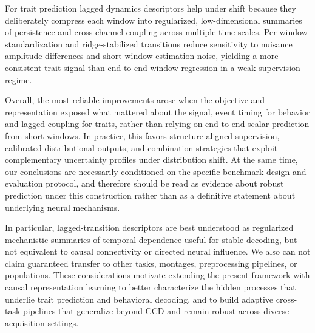 \documentclass[12pt]{article}
\begin{document}
For trait prediction lagged dynamics descriptors help under shift because they deliberately compress each window into regularized, low-dimensional summaries of persistence and cross-channel coupling across multiple time scales. Per-window standardization and ridge-stabilized transitions reduce sensitivity to nuisance amplitude differences and short-window estimation noise, yielding a more consistent trait signal than end-to-end window regression in a weak-supervision regime.


Overall, the most reliable improvements arose when the objective and representation exposed what mattered about
the signal, event timing for behavior and lagged coupling for traits, rather than relying on end-to-end scalar prediction
from short windows. In practice, this favors structure-aligned supervision, calibrated distributional outputs, and combination strategies that exploit complementary uncertainty profiles under distribution shift. At the same time, our conclusions are necessarily conditioned on the specific benchmark design and evaluation protocol, and therefore should be read as evidence about robust prediction under this construction rather than as a definitive statement about underlying neural mechanisms. 


In particular, lagged-transition descriptors are best understood as regularized mechanistic summaries of temporal dependence useful for stable decoding, but not equivalent to causal connectivity or directed neural influence. We also can not claim guaranteed transfer to other tasks, montages, preprocessing pipelines, or populations. These considerations motivate extending the present framework with causal representation learning to better characterize the hidden processes that underlie trait prediction and behavioral decoding, and to build adaptive cross-task pipelines that generalize beyond CCD and remain robust across diverse acquisition settings.









% 




\end{document}

